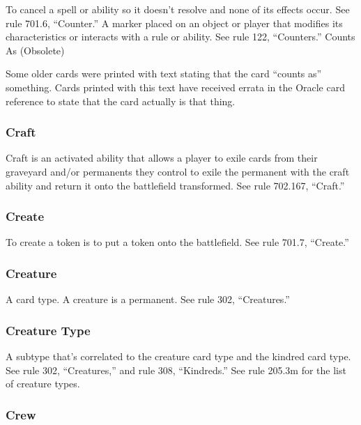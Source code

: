 {{{{{{To cancel a spell or ability so it doesn’t resolve and none of its effects occur. See rule 701.6, “Counter.”
A marker placed on an object or player that modifies its characteristics or interacts with a rule or ability. See rule 122, “Counters.”
Counts As (Obsolete)

Some older cards were printed with text stating that the card “counts as” something. Cards printed with this text have received errata in the Oracle card reference to state that the card actually is that thing.

\subsubsection*{Craft}

Craft is an activated ability that allows a player to exile cards from their graveyard and/or permanents they control to exile the permanent with the craft ability and return it onto the battlefield transformed. See rule 702.167, “Craft.”

\subsubsection*{Create}

To create a token is to put a token onto the battlefield. See rule 701.7, “Create.”

\subsubsection*{Creature}

A card type. A creature is a permanent. See rule 302, “Creatures.”

\subsubsection*{Creature Type}

A subtype that’s correlated to the creature card type and the kindred card type. See rule 302, “Creatures,” and rule 308, “Kindreds.” See rule 205.3m for the list of creature types.

\subsubsection*{Crew}

}}}}}}
